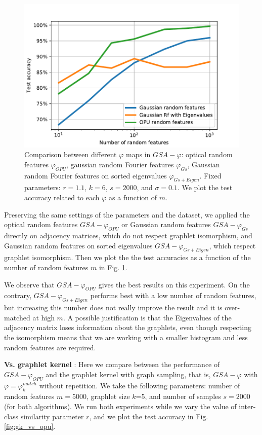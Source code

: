 \begin{figure}[h]
\centering
\includegraphics[scale=0.6]{figs/phi_comparison.pdf}
\caption[Comparison between different $\varphi$ maps in $GSA-\varphi$]{Comparison between different $\varphi$ maps in $GSA-\varphi$: optical random features $\varphi_{OPU}$, gaussian random Fourier features $\varphi_{Gs}$, Gaussian random Fourier features on sorted eigenvalues $\varphi_{Gs+Eigen}$. Fixed parameters: $r=1.1$, $k=6$,  $s=2000$, and $\sigma=0.1$. We plot the test accuracy related to each $\varphi$ as a function of $m$.}
\label{fig:phi_comparison}
\end{figure}
Preserving the same settings of the parameters and the dataset, we applied the optical random features $GSA-\varphi_{OPU}$ or Gaussian random features $GSA-\varphi_{Gs}$ directly on adjacency matrices, which do not respect graphlet isomorphism, and Gaussian random features on sorted eigenvalues $GSA-\varphi_{Gs+Eigen}$, which respect graphlet isomorphism. Then we plot the the test accuracies as a  function of the number of random features $m$ in Fig. \ref{fig:phi_comparison}.

We observe that $GSA-\varphi_{OPU}$ gives the best results on this experiment. On the contrary, $GSA-\varphi_{Gs+Eigen}$ performs best with a low number of random features, but increasing this number does not really improve the result and it is over-matched at high $m$. A possible justification is that the Eigenvalues of the adjacency matrix loses information about the graphlets, even though respecting the isomorphism means that we are working with a smaller histogram and less random features are required.

\textbf{ Vs. graphlet kernel} :
Here we compare between the performance of $GSA-\varphi_{OPU}$ and the graphlet kernel with graph sampling, that is, $GSA-\varphi$ with $\varphi = \varphi^{match}_k$ without repetition. We take the following parameters: number of random features $m=5000$, graphlet size $k$=5, and number of samples $s=2000$ (for both algorithms). We run both experiments while we vary the value of inter-class similarity parameter $r$, and we plot the test accuracy in Fig. \ref{fig:gk_vs_opu}.

